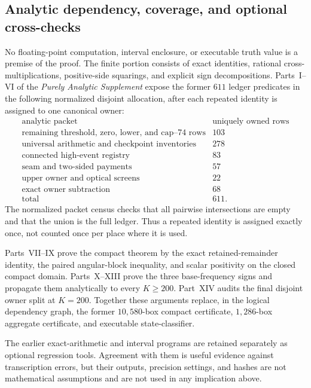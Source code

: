 \documentclass[11pt]{article}
\numberwithin{equation}{section}
\theoremstyle{definition}
\theoremstyle{remark}
\begin{document}
\subsection{Analytic dependency, coverage, and optional cross-checks}
\label{cm:sec-certificate-protocol}

No floating-point computation, interval enclosure, or executable truth value
is a premise of the proof.  The finite portion consists of exact identities,
rational cross-multiplications, positive-side squarings, and explicit sign
decompositions.  Parts~I--VI of the \emph{Purely Analytic Supplement} expose
the former \(611\) ledger predicates in the following normalized disjoint
allocation, after each repeated identity is assigned to one canonical owner:
\[
\begin{array}{c|r}
\text{analytic packet}&\text{uniquely owned rows}\\ \hline
\text{remaining threshold, zero, lower, and cap--74 rows}&103\\
\text{universal arithmetic and checkpoint inventories}&278\\
\text{connected high-event registry}&83\\
\text{seam and two-sided payments}&57\\
\text{upper owner and optical screens}&22\\
\text{exact owner subtraction}&68\\ \hline
\text{total}&611.
\end{array}
\]
The normalized packet census checks that all pairwise intersections are empty and that
the union is the full ledger.  Thus a repeated identity is assigned exactly
once, not counted once per place where it is used.

Parts~VII--IX prove the compact theorem by the exact retained-remainder
identity, the paired angular-block inequality, and scalar positivity on the
closed compact domain.  Parts~X--XIII prove the three base-frequency signs
and propagate them analytically to every \(K\geq200\).  Part~XIV audits the
final disjoint owner split at \(K=200\).  Together these arguments replace,
in the logical dependency graph, the former \(10{,}580\)-box compact
certificate, \(1{,}286\)-box aggregate certificate, and executable
state-classifier.

The earlier exact-arithmetic and interval programs are retained separately
as optional regression tools.  Agreement with them is useful evidence
against transcription errors, but their outputs, precision settings, and
hashes are not mathematical assumptions and are not used in any implication
above.
\end{document}
